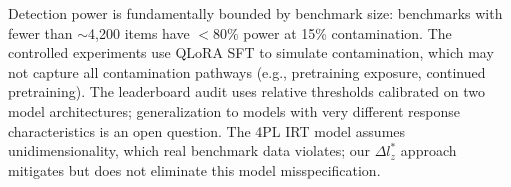 \documentclass[11pt,a4paper]{article}
\begin{document}
Detection power is fundamentally bounded by benchmark size: benchmarks with fewer than $\sim$4{,}200 items have $<$80\% power at 15\% contamination.
The controlled experiments use QLoRA SFT to simulate contamination, which may not capture all contamination pathways (e.g., pretraining exposure, continued pretraining).
The leaderboard audit uses relative thresholds calibrated on two model architectures; generalization to models with very different response characteristics is an open question.
The 4PL IRT model assumes unidimensionality, which real benchmark data violates; our $\Delta l_z^*$ approach mitigates but does not eliminate this model misspecification.


\end{document}
